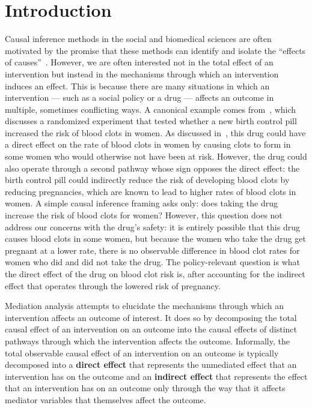 \chapter{Introduction}\label{chapter:intro}

Causal inference methods in the social and biomedical sciences are often motivated by the promise 
that these methods can identify and isolate the ``effects of causes''~\citep{holland1986}. 
However, we are often interested not in the total effect of an intervention but instead in 
the mechanisms through which an intervention induces an effect. This is because there are 
many situations in which an intervention --- such as a social policy or a drug --- affects 
an outcome in multiple, sometimes conflicting ways. A canonical example comes from~\cite{hesslow1976}, 
which discusses a randomized experiment that tested whether a new birth control pill increased the 
risk of blood clots in women. As discussed in~\cite{pearl2001}, this drug could have a direct effect 
on the rate of blood clots in women by causing clots to form in some women who would otherwise not 
have been at risk. However, the drug could also operate through a second pathway whose sign opposes 
the direct effect: the birth control pill could indirectly reduce the risk of developing blood clots 
by reducing pregnancies, which are known to lead to higher rates of blood clots in women. A simple 
causal inference framing asks only: does taking the drug increase the risk of blood clots for women? 
However, this question does not address our concerns with the drug's safety: it is entirely possible 
that this drug causes blood clots in some women, but because the women who take the drug get pregnant 
at a lower rate, there is no observable difference in blood clot rates for women who did and did not 
take the drug. The policy-relevant question is what the direct effect of the drug on blood clot risk 
is, after accounting for the indirect effect that operates through the lowered risk of pregnancy. 

Mediation analysis attempts to elucidate the mechanisms through which an intervention affects an 
outcome of interest. It does so by decomposing the total causal effect of an intervention on an 
outcome into the causal effects of distinct pathways through which the intervention affects the 
outcome. Informally, the total observable causal effect of an intervention on an outcome is typically 
decomposed into a \textbf{direct effect} that represents the unmediated effect that an intervention 
has on the outcome and an \textbf{indirect effect} that represents the effect that an intervention 
has on an outcome only through the way that it affects mediator variables that themselves affect 
the outcome. 

